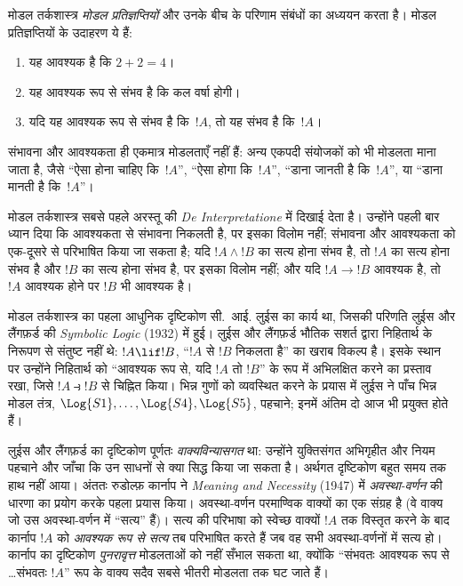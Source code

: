 \documentclass[../../../include/open-logic-section]{subfiles}
\begin{document}


मोडल तर्कशास्त्र \emph{मोडल प्रतिज्ञप्तियों} और उनके बीच के परिणाम संबंधों
का अध्ययन करता है। मोडल प्रतिज्ञप्तियों के उदाहरण ये हैं:
\begin{enumerate}
\item यह आवश्यक है कि $2+2=4$।
\item यह आवश्यक रूप से संभव है कि कल वर्षा होगी।
\item यदि यह आवश्यक रूप से संभव है कि~$!A$, तो यह संभव है कि~$!A$।
\end{enumerate}
संभावना और आवश्यकता ही एकमात्र मोडलताएँ नहीं हैं: अन्य एकपदी संयोजकों को भी
मोडलता माना जाता है, जैसे ``ऐसा होना चाहिए कि~$!A$'', ``ऐसा होगा
कि~$!A$'', ``डाना जानती है कि~$!A$'', या ``डाना मानती है कि~$!A$''।

मोडल तर्कशास्त्र सबसे पहले अरस्तू की \emph{De Interpretatione} में दिखाई
देता है। उन्होंने पहली बार ध्यान दिया कि आवश्यकता से संभावना निकलती है,
पर इसका विलोम नहीं; संभावना और आवश्यकता को एक-दूसरे से परिभाषित किया जा
सकता है; यदि $!A \land !B$ का सत्य होना संभव है, तो $!A$ का सत्य होना
संभव है और $!B$ का सत्य होना संभव है, पर इसका विलोम नहीं; और यदि
$!A \to !B$ आवश्यक है, तो $!A$ आवश्यक होने पर $!B$ भी आवश्यक है।

मोडल तर्कशास्त्र का पहला आधुनिक दृष्टिकोण सी.~आई. लुईस का कार्य था, जिसकी
परिणति लुईस और लैंगफ़र्ड की \emph{Symbolic Logic} (1932) में हुई। लुईस और
लैंगफ़र्ड भौतिक सशर्त द्वारा निहितार्थ के निरूपण से संतुष्ट नहीं थे:
$!A \lif !B$, ``$!A$ से $!B$ निकलता है'' का खराब विकल्प है। इसके स्थान पर
उन्होंने निहितार्थ को ``आवश्यक रूप से, यदि $!A$ तो $!B$'' के रूप में
अभिलक्षित करने का प्रस्ताव रखा, जिसे $!A \strictif !B$ से चिह्नित किया।
भिन्न गुणों को व्यवस्थित करने के प्रयास में लुईस ने पाँच भिन्न मोडल तंत्र,
$\Log{S1}, \ldots, \Log{S4}, \Log{S5}$, पहचाने; इनमें अंतिम दो आज भी
प्रयुक्त होते हैं।

लुईस और लैंगफ़र्ड का दृष्टिकोण पूर्णतः \emph{वाक्यविन्यासगत} था: उन्होंने
युक्तिसंगत अभिगृहीत और नियम पहचाने और जाँचा कि उन साधनों से क्या सिद्ध किया
जा सकता है। अर्थगत दृष्टिकोण बहुत समय तक हाथ नहीं आया। अंततः रुडोल्फ़
कार्नाप ने \emph{Meaning and Necessity} (1947) में \emph{अवस्था-वर्णन} की
धारणा का प्रयोग करके पहला प्रयास किया। अवस्था-वर्णन परमाण्विक वाक्यों का
एक संग्रह है (वे वाक्य जो उस अवस्था-वर्णन में ``सत्य'' हैं)। सत्य की
परिभाषा को स्वेच्छ वाक्यों $!A$ तक विस्तृत करने के बाद कार्नाप $!A$ को
\emph{आवश्यक रूप से सत्य} तब परिभाषित करते हैं जब वह सभी अवस्था-वर्णनों में
सत्य हो। कार्नाप का दृष्टिकोण \emph{पुनरावृत्त} मोडलताओं को नहीं सँभाल
सकता था, क्योंकि ``संभवतः आवश्यक रूप से \ldots संभवतः $!A$'' रूप के वाक्य
सदैव सबसे भीतरी मोडलता तक घट जाते हैं।
\end{document}
